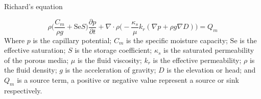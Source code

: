 Richard's equation 

\begin{equation}\label{eq:richards}
  \rho \Big( \frac{C_m}{\rho g} + \mathrm{Se}S \Big) \frac{\partial p}{\partial t} +
  \nabla \cdot \rho \Big( -\frac{\kappa_s}{\mu} k_r (\nabla p + \rho g \nabla D)\Big) =
  Q_m
\end{equation}
Where $p$ is the capillary potential; $C_m$ is the specific moisture capacity; $\mathrm{Se}$ is the effective saturation; $S$ is the storage coefficient; $\kappa_s$ is the saturated permeability of the porous media; $\mu$ is the fluid viscosity; $k_r$ is the effective permeability; $\rho$ is the fluid density; $g$ is the acceleration of gravity; $D$ is the elevation or head; and $Q_m$ is a source term, a positive or negative value represent a source or sink respectively.\par
